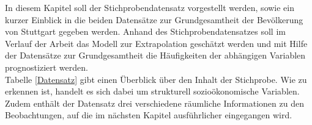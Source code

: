 \documentclass{Vorlage}
\begin{document}
In diesem Kapitel soll der Stichprobendatensatz vorgestellt werden, sowie ein kurzer Einblick in die beiden Datensätze zur Grundgesamtheit der Bevölkerung von Stuttgart gegeben werden. Anhand des Stichprobendatensatzes soll im Verlauf der Arbeit das Modell zur Extrapolation geschätzt werden und mit Hilfe der Datensätze zur Grundgesamtheit die Häufigkeiten der abhängigen Variablen prognostiziert werden. \\
Tabelle \ref{Datensatz} gibt einen Überblick über den Inhalt der Stichprobe. Wie zu erkennen ist, handelt es sich dabei um strukturell sozioökonomische Variablen. Zudem enthält der Datensatz drei verschiedene räumliche Informationen zu den Beobachtungen, auf die im nächsten Kapitel ausführlicher eingegangen wird.\\

\begin{table}[h]
\centering
\caption{Datensatz}
\label{Datensatz}
\end{table}
\end{document}
